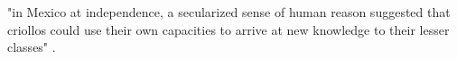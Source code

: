 "in Mexico at independence, a secularized sense of human reason suggested that criollos could use their own capacities to arrive at new knowledge to their lesser classes" \cite[135]{Vogeley2001}.
